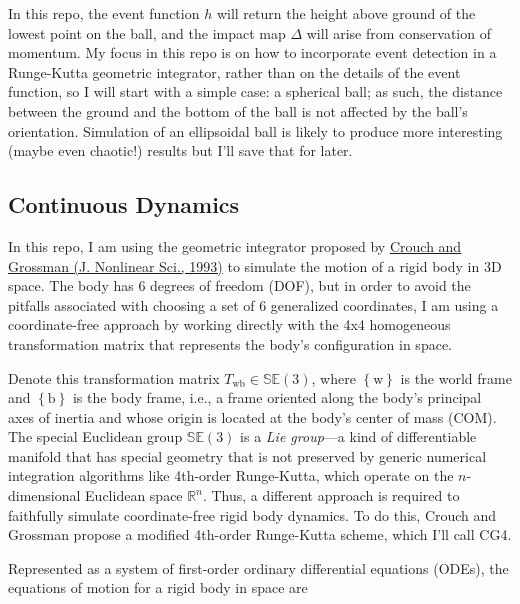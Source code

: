 \documentclass[]{article}
\theoremstyle{definition}
\theoremstyle{remark}
\begin{document}
In this repo, the event function $h$ will return the height above ground of the lowest point on the ball, and the impact map $\Delta$ will arise from conservation of momentum.
My focus in this repo is on how to incorporate event detection in a Runge-Kutta geometric integrator, rather than on the details of the event function, so I will start with a simple case: a spherical ball;
as such, the distance between the ground and the bottom of the ball is not affected by the ball's orientation.
Simulation of an ellipsoidal ball is likely to produce more interesting (maybe even chaotic!) results but I'll save that for later.

\subsection{Continuous Dynamics}
In this repo, I am using the geometric integrator proposed by \href{https://doi.org/10.1007/BF02429858}{Crouch and Grossman (J. Nonlinear Sci., 1993)} to simulate the motion of a rigid body in 3D space.
The body has 6 degrees of freedom (DOF), but in order to avoid the pitfalls associated with choosing a set of 6 generalized coordinates, I am using a coordinate-free approach by working directly with the 4x4 homogeneous transformation matrix that represents the body's configuration in space.

Denote this transformation matrix $T_\mathrm{wb}\in \mathbb{SE}(3)$, where $\left\{\mathrm{w}\right\}$ is the world frame and $\left\{\mathrm{b}\right\}$ is the body frame, i.e., a frame oriented along the body's principal axes of inertia and whose origin is located at the body's center of mass (COM).
The special Euclidean group $\mathbb{SE}(3)$ is a \textit{Lie group}---a kind of differentiable manifold that has special geometry that is not preserved by generic numerical integration algorithms like 4th-order Runge-Kutta, which operate on the $n$-dimensional Euclidean space $\mathbb{R}^n$.
Thus, a different approach is required to faithfully simulate coordinate-free rigid body dynamics. To do this, Crouch and Grossman propose a modified 4th-order Runge-Kutta scheme, which I'll call CG4.

Represented as a system of first-order ordinary differential equations (ODEs), the equations of motion for a rigid body in space are
\end{document}

